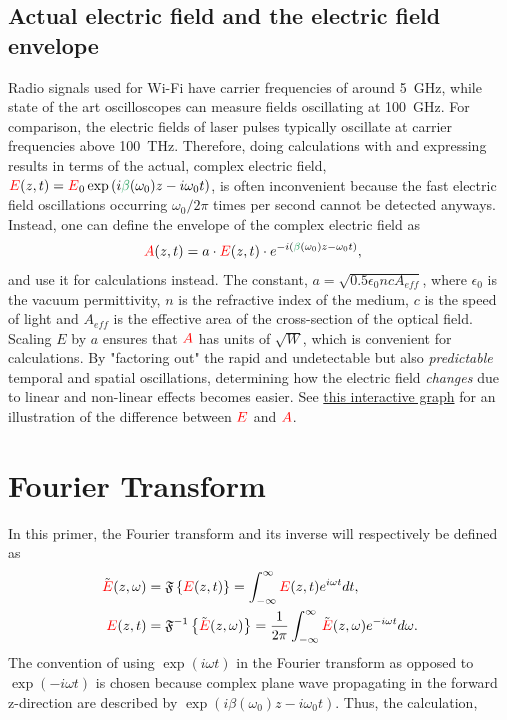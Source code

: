 \subsection{Actual electric field and the electric field envelope}
Radio signals used for Wi-Fi have carrier frequencies of around 5~GHz, while state of the art oscilloscopes can measure fields oscillating at 100~GHz. For comparison, the electric fields of laser pulses typically oscillate at carrier frequencies above 100~THz. Therefore, doing calculations with and expressing results in terms of the actual, complex electric field, $\E(z,t) =\E_0 \exp\left( i\betag(\omega_0)z-i\omega_0 t\right)$, is often inconvenient because the fast electric field oscillations occurring $\omega_0/2\pi$ times per second cannot be detected anyways. Instead, one can define the envelope of the complex electric field as
\begin{align}
\label{eq:envelope}
    \A(z,t) &=a\cdot\E(z,t)\cdot e^{-i(\betag(\omega_0)z-\omega_0t)},
\end{align}
and use it for calculations instead. The constant, $a=\sqrt{0.5\epsilon_0ncA_{eff}}$, where $\epsilon_0$ is the vacuum permittivity, $n$ is the refractive index of the medium, $c$ is the speed of light and $A_{eff}$ is the effective area of the cross-section of the optical field. Scaling $E$ by $a$ ensures that $\textcolor{red}{A}$ has units of $\sqrt{W}$, which is convenient for calculations. By "factoring out" the rapid and undetectable but also \emph{predictable} temporal and spatial oscillations, determining how the electric field \emph{changes} due to linear and non-linear effects becomes easier. See \href{https://www.desmos.com/calculator/rsw2fn5af6 }{this interactive graph} for an illustration of the difference between $\textcolor{red}{E}$ and $\textcolor{red}{A}$. 



\section{Fourier Transform}

In this primer, the Fourier transform and its inverse will respectively be defined as
\begin{align}
    \Tilde{\textcolor{red}{E}}(z,\omega) &= \mathfrak{F}\left\{\textcolor{red}{E}(z,t)\right\} = \int_{-\infty}^{\infty} \textcolor{red}{E}(z,t) e^{i\omega t} dt, \\ \nonumber
    \textcolor{red}{E}(z,t) &= \mathfrak{F}^{-1}\left\{\Tilde{\textcolor{red}{E}}(z,\omega)\right\} = \frac{1}{2\pi} \int_{-\infty}^{\infty} \Tilde{\textcolor{red}{E}}(z,\omega) e^{-i\omega t} d\omega.
\end{align}
The convention of using $\exp(i\omega t)$ in the Fourier transform as opposed to $\exp(-i\omega t)$ is chosen because complex plane wave propagating in the forward z-direction are described by $\exp(i\beta(\omega_0)z-i\omega_0 t)$. Thus, the calculation,

